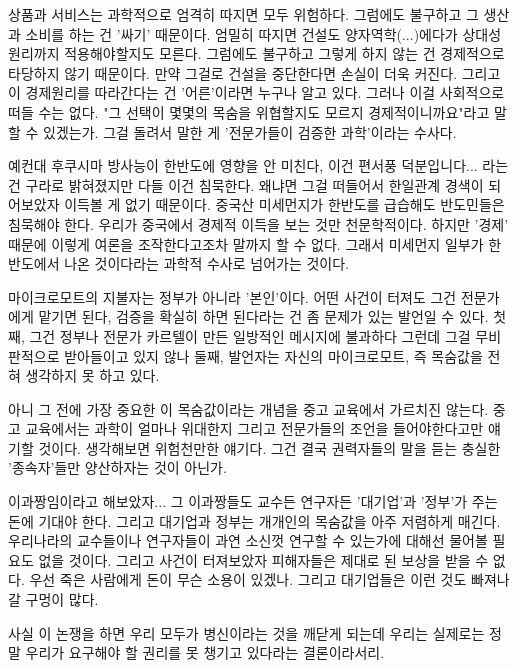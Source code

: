 상품과 서비스는 과학적으로 엄격히 따지면 모두 위험하다. 그럼에도 불구하고 그 생산과 소비를 하는 건 '싸기' 때문이다.
엄밀히 따지면 건설도 양자역학(...)에다가 상대성 원리까지 적용해야할지도 모른다.
그럼에도 불구하고 그렇게 하지 않는 건 경제적으로 타당하지 않기 때문이다. 만약 그걸로 건설을 중단한다면 손실이 더욱 커진다.
그리고 이 경제원리를 따라간다는 건 '어른'이라면 누구나 알고 있다.
그러나 이걸 사회적으로 떠들 수는 없다. "그 선택이 몇몇의 목숨을 위협할지도 모르지 경제적이니까요"라고 말할 수 있겠는가.
그걸 돌려서 말한 게 '전문가들이 검증한 과학'이라는 수사다.
\vspace{5mm}

예컨대 후쿠시마 방사능이 한반도에 영향을 안 미친다, 이건 편서풍 덕분입니다... 라는 건 구라로 밝혀졌지만
다들 이건 침묵한다. 왜냐면 그걸 떠들어서 한일관계 경색이 되어보았자 이득볼 게 없기 때문이다.
중국산 미세먼지가 한반도를 급습해도 반도민들은 침묵해야 한다. 우리가 중국에서 경제적 이득을 보는 것만 천문학적이다.
하지만 '경제' 때문에 이렇게 여론을 조작한다고조차 말까지 할 수 없다.
그래서 미세먼지 일부가 한반도에서 나온 것이다라는 과학적 수사로 넘어가는 것이다.
\vspace{5mm}

마이크로모트의 지불자는 정부가 아니라 '본인'이다.
어떤 사건이 터져도 그건 전문가에게 맡기면 된다, 검증을 확실히 하면 된다라는 건 좀 문제가 있는 발언일 수 있다.
첫째, 그건 정부나 전문가 카르텔이 만든 일방적인 메시지에 불과하다 그런데 그걸 무비판적으로 받아들이고 있지 않나
둘째, 발언자는 자신의 마이크로모트, 즉 목숨값을 전혀 생각하지 못 하고 있다.
\vspace{5mm}

아니 그 전에 가장 중요한 이 목숨값이라는 개념을 중고 교육에서 가르치진 않는다.
중고 교육에서는 과학이 얼마나 위대한지 그리고 전문가들의 조언을 들어야한다고만 얘기할 것이다.
생각해보면 위험천만한 얘기다. 그건 결국 권력자들의 말을 듣는 충실한 '종속자'들만 양산하자는 것이 아닌가.
\vspace{5mm}

이과짱임이라고 해보았자... 그 이과짱들도 교수든 연구자든 '대기업'과 '정부'가 주는 돈에 기대야 한다.
그리고 대기업과 정부는 개개인의 목숨값을 아주 저렴하게 매긴다.
우리나라의 교수들이나 연구자들이 과연 소신껏 연구할 수 있는가에 대해선 물어볼 필요도 없을 것이다.
그리고 사건이 터져보았자 피해자들은 제대로 된 보상을 받을 수 없다. 우선 죽은 사람에게 돈이 무슨 소용이 있겠나.
그리고 대기업들은 이런 것도 빠져나갈 구멍이 많다.
\vspace{5mm}

사실 이 논쟁을 하면 우리 모두가 병신이라는 것을 깨닫게 되는데
우리는 실제로는 정말 우리가 요구해야 할 권리를 못 챙기고 있다라는 결론이라서리.
\vspace{5mm}


